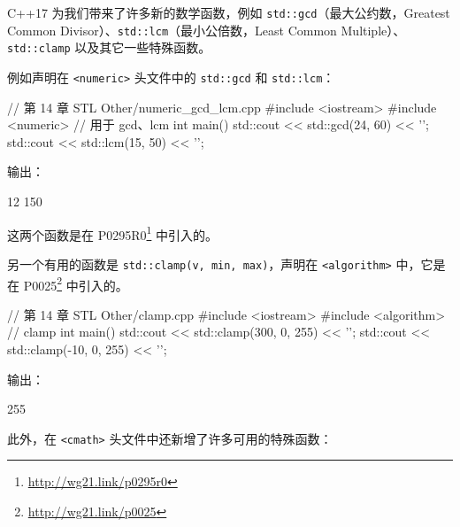 C++17 为我们带来了许多新的数学函数，例如 \texttt{std::gcd}（最大公约数，Greatest Common Divisor）、\texttt{std::lcm}（最小公倍数，Least Common Multiple）、\texttt{std::clamp} 以及其它一些特殊函数。

例如声明在 \texttt{<numeric>} 头文件中的 \texttt{std::gcd} 和 \texttt{std::lcm}：

\begin{codebox}[cpp]
// 第 14 章 STL Other/numeric_gcd_lcm.cpp
#include <iostream>
#include <numeric>
// 用于 gcd、lcm
int main() {
std::cout << std::gcd(24, 60) << '\n';
std::cout << std::lcm(15, 50) << '\n';
}
\end{codebox}

输出：

\begin{codebox}
12
150
\end{codebox}

这两个函数是在 P0295R0\footnote{\url{http://wg21.link/p0295r0}} 中引入的。

另一个有用的函数是 \texttt{std::clamp(v, min, max)}，声明在 \texttt{<algorithm>} 中，它是在 P0025\footnote{\url{http://wg21.link/p0025}} 中引入的。

\begin{codebox}[cpp]
// 第 14 章 STL Other/clamp.cpp
#include <iostream>
#include <algorithm>
// clamp
int main() {
std::cout << std::clamp(300, 0, 255) << '\n';
std::cout << std::clamp(-10, 0, 255) << '\n';
}
\end{codebox}

输出：

\begin{codebox}
255
\end{codebox}

此外，在 \texttt{<cmath>} 头文件中还新增了许多可用的特殊函数：

